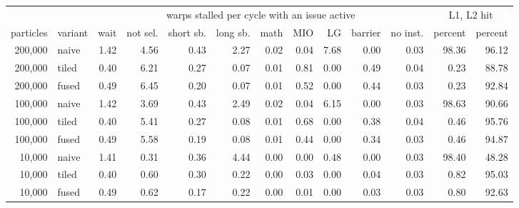 \begin{tabular}{r l rrrrrrrrr rr}
\toprule
& & \multicolumn{9}{c}{warps stalled per cycle with an issue active} & \multicolumn{2}{c}{L1, L2 hit} \\
\cmidrule(lr){3-11}\cmidrule(lr){12-13}
particles & variant & wait & not sel. & short sb. & long sb. & math & MIO & LG & barrier & no inst. & percent & percent \\
\midrule
200,000 & naive & 1.42 & 4.56 & 0.43 & 2.27 & 0.02 & 0.04 & 7.68 & 0.00 & 0.03 & 98.36 & 96.12 \\
200,000 & tiled & 0.40 & 6.21 & 0.27 & 0.07 & 0.01 & 0.81 & 0.00 & 0.49 & 0.04 & 0.23 & 88.78 \\
200,000 & fused & 0.49 & 6.45 & 0.20 & 0.07 & 0.01 & 0.52 & 0.00 & 0.44 & 0.03 & 0.23 & 92.84 \\
100,000 & naive & 1.42 & 3.69 & 0.43 & 2.49 & 0.02 & 0.04 & 6.15 & 0.00 & 0.03 & 98.63 & 90.66 \\
100,000 & tiled & 0.40 & 5.41 & 0.27 & 0.08 & 0.01 & 0.68 & 0.00 & 0.38 & 0.04 & 0.46 & 95.76 \\
100,000 & fused & 0.49 & 5.58 & 0.19 & 0.08 & 0.01 & 0.44 & 0.00 & 0.34 & 0.03 & 0.46 & 94.87 \\
10,000 & naive & 1.41 & 0.31 & 0.36 & 4.44 & 0.00 & 0.00 & 0.48 & 0.00 & 0.03 & 98.40 & 48.28 \\
10,000 & tiled & 0.40 & 0.60 & 0.30 & 0.22 & 0.00 & 0.03 & 0.00 & 0.04 & 0.03 & 0.82 & 95.03 \\
10,000 & fused & 0.49 & 0.62 & 0.17 & 0.22 & 0.00 & 0.01 & 0.00 & 0.03 & 0.03 & 0.80 & 92.63 \\
\bottomrule
\end{tabular}
